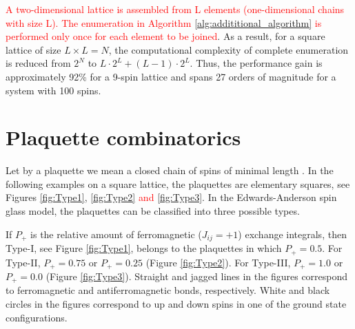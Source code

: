 \documentclass[preprint,12pt]{elsarticle}
\begin{document}
	\textcolor{red}{A two-dimensional lattice is assembled from L elements (one-dimensional chains with size L). The enumeration in Algorithm \ref{alg:addititional_algorithm} is performed only once for each element to be joined}. As a result, for a square lattice of size $L \times L = N$, the computational complexity of complete enumeration is reduced from $2^{N}$ to $L \cdot 2^L + (L - 1) \cdot 2^L$. Thus, the performance gain is approximately 92\% for a 9-spin lattice and spans 27 orders of magnitude for a system with 100 spins.
	
	\section{Plaquette combinatorics}
	
	Let by a plaquette we mean a closed chain of spins of minimal length \cite{lebrecht2015j}. In the following examples on a square lattice, the plaquettes are elementary squares, see Figures \ref{fig:Type1}, \ref{fig:Type2} \textcolor{red}{and} \ref{fig:Type3}. In the Edwards-Anderson spin glass model, the plaquettes can be classified into three possible types. 
	
	If $P_+$ is the relative amount of ferromagnetic ($J_{ij}=+1$) exchange integrals, then Type-I, see Figure \ref{fig:Type1}, belongs to the plaquettes in which $P_+=0.5$. For Type-II, $P_+=0.75$ or $P_+=0.25$ (Figure \ref{fig:Type2}). For Type-III, $P_+=1.0$ or $P_+=0.0$ (Figure \ref{fig:Type3}). Straight and jagged lines in the figures correspond to ferromagnetic and antiferromagnetic bonds, respectively. White and black circles in the figures correspond to up and down spins in one of the ground state configurations.
	
\end{document}
